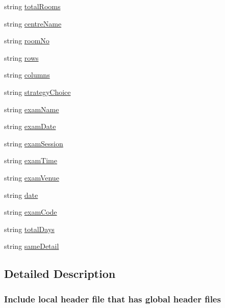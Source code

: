 \begin{DoxyCompactItemize}
\item 
string \hyperlink{classInputFieldName_a51fe8230341d7863ffd4672f2c986beb}{total\-Rooms}
\item 
string \hyperlink{classInputFieldName_a19c67f2d38cde97f856d4ca3639f4fc7}{centre\-Name}
\item 
string \hyperlink{classInputFieldName_abb6b245e03e76aa29d7ef8733298e72f}{room\-No}
\item 
string \hyperlink{classInputFieldName_a1b5a819437f52b4bb6b0ea59f542f9a9}{rows}
\item 
string \hyperlink{classInputFieldName_abca049f347e589f24b672c19907c5c72}{columns}
\item 
string \hyperlink{classInputFieldName_a9a6b827d404cb279cc0ed836c069e4a9}{strategy\-Choice}
\item 
string \hyperlink{classInputFieldName_a4cee41667cdc0e38f8f76af94ef39c36}{exam\-Name}
\item 
string \hyperlink{classInputFieldName_a4e60d793497c36b2d80e2411cbb915d8}{exam\-Date}
\item 
string \hyperlink{classInputFieldName_afef45e787d3c737f9bdc3126ce29d8b9}{exam\-Session}
\item 
string \hyperlink{classInputFieldName_ab667062be019e5912683d33c45885bd3}{exam\-Time}
\item 
string \hyperlink{classInputFieldName_affaa2fe8246959748f43ea58f161b2b5}{exam\-Venue}
\item 
string \hyperlink{classInputFieldName_afb053a44abe76e108533e23902e90321}{date}
\item 
string \hyperlink{classInputFieldName_a3cc09a852d20e96bb4908b9f66c01ed7}{exam\-Code}
\item 
string \hyperlink{classInputFieldName_a12ba65660edd7f8f7ecf1e25893716da}{total\-Days}
\item 
string \hyperlink{classInputFieldName_a6de91205e7eac3168e17d100ab4d8e64}{same\-Detail}
\end{DoxyCompactItemize}


\subsection{Detailed Description}


 \subsubsection*{Include local header file that has global header files}



